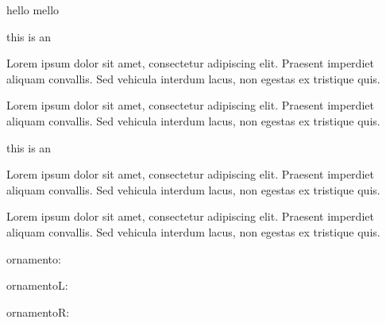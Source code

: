 \documentclass[a4paper]{scrartcl}
\begin{document}
hello mello 



this is an 


Lorem ipsum dolor sit amet, consectetur adipiscing elit. Praesent imperdiet aliquam convallis. Sed vehicula interdum lacus, non egestas ex tristique quis.


Lorem ipsum dolor sit amet, consectetur adipiscing elit. Praesent imperdiet aliquam convallis. Sed vehicula interdum lacus, non egestas ex tristique quis.


this is an 


Lorem ipsum dolor sit amet, consectetur adipiscing elit. Praesent imperdiet aliquam convallis. Sed vehicula interdum lacus, non egestas ex tristique quis.




Lorem ipsum dolor sit amet, consectetur adipiscing elit. Praesent imperdiet aliquam convallis. Sed vehicula interdum lacus, non egestas ex tristique quis.

ornamento:

\ornamento

ornamentoL:

\ornamentoLD

ornamentoR:

\ornamentoRD

\KoraysHomeworkStyCredit
\end{document}
